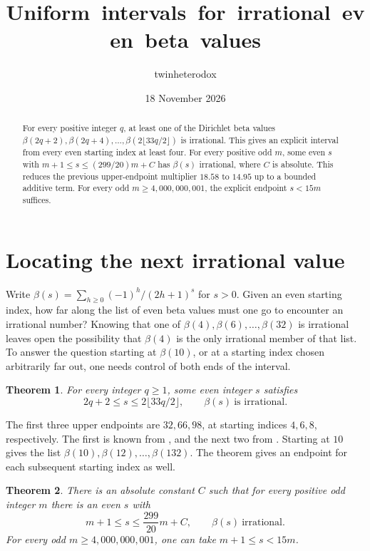 \documentclass[11pt]{article}
\title{\fontsize{17}{21}\selectfont\mbox{Uniform intervals for irrational even beta values}}
\author{twinheterodox}
\date{18 November 2026}
\newtheorem{theorem}{Theorem}[section]
\numberwithin{equation}{section}
\begin{document}
\maketitle

\begin{abstract}
For every positive integer \(q\), at least one of the Dirichlet beta values
\(\beta(2q+2),\beta(2q+4),\ldots,\beta(2\lfloor33q/2\rfloor)\) is irrational.
This gives an explicit interval from every even starting index at least four.
For every positive odd \(m\), some even \(s\) with \(m+1\le s\le(299/20)m+C\)
has \(\beta(s)\) irrational, where \(C\) is absolute. This reduces the
previous upper-endpoint multiplier \(18.58\) to \(14.95\) up to a bounded
additive term. For every odd \(m\ge4{,}000{,}000{,}001\), the explicit
endpoint \(s<15m\) suffices.
\end{abstract}

\section{Locating the next irrational value}

Write \(\beta(s)=\sum_{h\ge0}(-1)^h/(2h+1)^s\) for \(s>0\).
Given an even starting index, how far along the list of even beta values
must one go to encounter an irrational number? Knowing that one of
\(\beta(4),\beta(6),\ldots,\beta(32)\) is irrational leaves open the
possibility that \(\beta(4)\) is the only irrational member of that
list. To answer the question starting at \(\beta(10)\), or at a
starting index chosen arbitrarily far out, one needs control of both
ends of the interval.

\begin{theorem}\label{th:all}
For every integer \(q\ge1\), some even integer \(s\) satisfies
\[
             2q+2\le s\le 2\lfloor 33q/2\rfloor,
             \qquad \beta(s)\ \text{is irrational}.
\]
\end{theorem}

The first three upper endpoints are \(32,66,98\), at starting indices
\(4,6,8\), respectively. The first is known from \cite{fifteen}, and
the next two from \cite{two}. Starting at \(10\) gives the list
\(\beta(10),\beta(12),\ldots,\beta(132)\). The theorem gives an endpoint
for each subsequent starting index as well.

\begin{theorem}\label{th:slope}
There is an absolute constant \(C\) such that for every positive odd
integer \(m\) there is an even \(s\) with
\[
         m+1\le s\le \frac{299}{20}m+C,\qquad
         \beta(s)\ \text{irrational}.
\]
For every odd \(m\ge4{,}000{,}000{,}001\), one can take \(m+1\le s<15m\).
\end{theorem}
\end{document}
